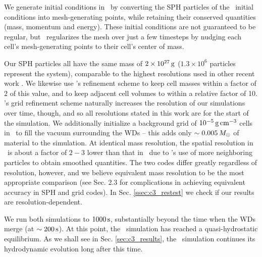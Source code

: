 We generate initial conditions in \arepo\ by converting the SPH particles of the \gasoline\ initial conditions into mesh-generating points, while retaining their conserved quantities (mass, momentum and energy).  These initial conditions are not guaranteed to be regular, but \arepo\ regularizes the mesh over just a few timesteps by nudging each cell's mesh-generating points to their cell's center of mass.


Our SPH particles all have the same mass of $2\times10^{27}\,\mathrm{g}$ ($1.3\times10^{6}$ particles represent the system), comparable to the highest resolutions used in other recent work \citep{pakm+12, rask+14}.  We likewise use \arepo's refinement scheme to keep cell masses within a factor of $2$ of this value, and to keep adjacent cell volumes to within a relative factor of 10.  \arepo's grid refinement scheme naturally increases the resolution of our simulations over time, though, and so all resolutions stated in this work are for the start of the simulation.  We additionally initialize a background grid of $10^{-5}\,\gcc$ cells in \arepo\ to fill the vacuum surrounding the WDs -- this adds only $\sim0.005\,\Msun$ of material to the simulation.  At identical mass resolution, the spatial resolution in \gasoline\ is about a factor of $2-3$ lower than that in \arepo\ due to \gasoline's use of more neighboring particles to obtain smoothed quantities.  The two codes differ greatly regardless of resolution, however, and we believe equivalent mass resolution to be the most appropriate comparison (see \citeauthor{voge+12} Sec. 2.3 for complications in achieving equivalent accuracy in SPH and grid codes).  In Sec. \ref{ssec:c3_restest} we check if our results are resolution-dependent.

We run both simulations to $1000\,\mathrm{s}$, substantially beyond the time when the WDs merge (at $\sim200\,\mathrm{s}$).  At this point, the \gasoline\ simulation has reached a quasi-hydrostatic equilibrium.  As we shall see in Sec. \ref{sec:c3_results}, the \arepo\ simulation continues its hydrodynamic evolution long after this time.



